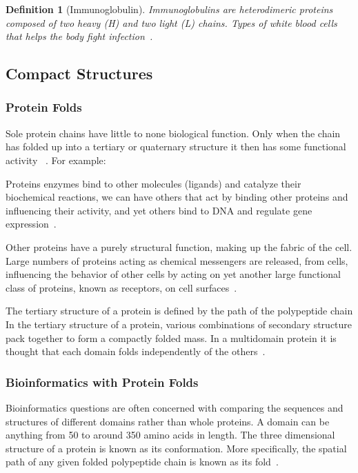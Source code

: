 \documentclass{report}
\newtheorem{definition}{Definition}[section]
\begin{document}
\begin{definition}[Immunoglobulin]
    Immunoglobulins are heterodimeric proteins composed of two heavy (H) and two light (L) chains. Types of white blood cells that helps the body fight infection~\cite{schroeder_structure_2010}.
\end{definition}

\subsection{Compact Structures}

\subsubsection{Protein Folds}
Sole protein chains have little to none biological function. Only when the chain has folded up into a tertiary or quaternary structure it then has some functional activity ~\cite{zvelebil_understanding_2008}. For example:

Proteins enzymes bind to other molecules (ligands) and catalyze their biochemical reactions, we can have others that act by binding other proteins and influencing their activity, and yet others bind to DNA and regulate gene expression~\cite{zvelebil_understanding_2008}.

Other proteins have a purely structural function, making up the fabric of the cell. Large numbers of proteins acting as chemical messengers are released, from cells, influencing the behavior of other cells by acting on yet another large functional class of proteins, known as receptors, on cell surfaces~\cite{zvelebil_understanding_2008}.

The tertiary structure of a protein is defined by the path of the polypeptide chain In the tertiary structure of a protein, various combinations of secondary structure pack together to form a compactly folded mass. In a multidomain protein it is thought that each domain folds independently of the others~\cite{zvelebil_understanding_2008}.

\subsubsection{Bioinformatics with Protein Folds}

Bioinformatics questions are often concerned with comparing the sequences and structures of different domains rather than whole proteins. A domain can be anything from 50 to around 350 amino acids in length. The three dimensional structure of a protein is known as its conformation. More specifically, the spatial path of any given folded polypeptide chain is known as its fold~\cite{zvelebil_understanding_2008}.
\end{document}
